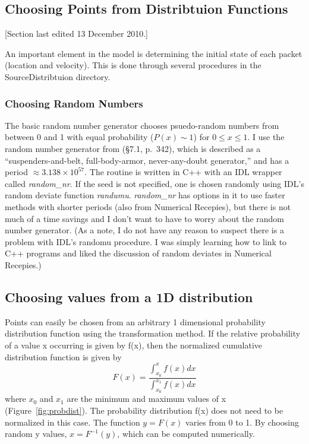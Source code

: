 \documentclass[11pt]{article}
\begin{document}
\subsection{Choosing Points from Distribtuion Functions}
[Section last edited 13 December 2010.]

An important element in the model is determining the initial state of each
packet (location and velocity). This is done through several procedures in the
SourceDistribtuion directory. 

\subsubsection{Choosing Random Numbers}

The basic random number generator chooses psuedo-random numbers from between 0
and 1 with equal probability ($P(x) \sim 1$) for $0\leq x \le 1$. I use the
random number generator from \cite{press2007} (\S7.1, p.\ 342), which is
described as a ``suspenders-and-belt, full-body-armor, never-any-doubt
generator,'' and has a period $\approx3.138\times10^{57}$. The routine is
written in C++ with an IDL wrapper called \textit{random\_nr}. If the seed is
not specified, one is chosen randomly using IDL's random deviate function
\textit{randumu}. \textit{random\_nr} has options in it to use faster methods
with shorter periods (also from Numerical Recepies), but there is not much of a
time savings and I don't want to have to worry about the random number
generator. (As a note, I do not have any reason to suspect there is a
problem with IDL's randomu procedure. I was simply learning how to link to C++
programs and liked the discussion of random deviates in Numerical Recepies.)

\subsection{Choosing values from a 1D distribution}

Points can easily be chosen from an arbitrary 1 dimensional probability 
distribution function using the transformation method. If the relative 
probability of a value x
occurring is given by f(x), then the normalized cumulative distribution 
function is given by 
\begin{equation}
F(x) = \frac{\int_{x_0}^x f(x) dx}{\int_{x_0}^{x_1} f(x) dx}
\end{equation}
where $x_0$ and $x_1$ are the minimum and maximum values of x
(Figure~\ref{fig:probdist}). The probability distribution f(x) does not need to
be normalized in this case.  The function $y=F(x)$ varies from 0 to 1. By 
choosing random y values, $x=F^{-1}(y)$, which can be computed numerically.
\end{document}
